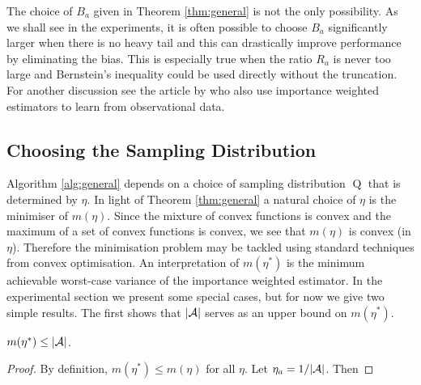 \begin{remark}\label{rem:truncate}
The choice of $B_a$ given in Theorem \ref{thm:general} is not the only possibility. As we shall see in the experiments, it is 
often possible to choose $B_a$ significantly
larger when there is no heavy tail and this can drastically improve performance by eliminating the bias. This is especially true when the ratio $R_a$ is never too large
and Bernstein's inequality could be used directly without the truncation. For another discussion see the article by \citet{BJQ13} who also use importance weighted estimators
to learn from observational data.
\end{remark}

\subsection*{Choosing the Sampling Distribution}

Algorithm \ref{alg:general} depends on a choice of sampling distribution $\operatorname{Q}$ that is determined by $\eta$. In light of Theorem \ref{thm:general}
a natural choice of $\eta$ is the minimiser of $m(\eta)$.
Since the mixture of convex functions is convex and the maximum of a set of convex functions is convex, we see that $m(\eta)$ is convex (in $\eta$).
Therefore the minimisation problem may be tackled using standard techniques from convex optimisation. 
An interpretation of $m(\eta^*)$ is the minimum achievable worst-case variance of the importance weighted estimator.
In the experimental section we present some special cases,
but for now we give two simple results. The first shows that $|\mathcal A|$ serves as an upper bound on $m(\eta^*)$.

\begin{proposition}\label{pro:m-bound}
$m(\eta^*) \leq |\mathcal A|$.
\end{proposition}

\begin{proof}
By definition, $m(\eta^*) \leq m(\eta)$ for all $\eta$. Let $\eta_a = 1/|\mathcal A|$. Then
\end{proof}

